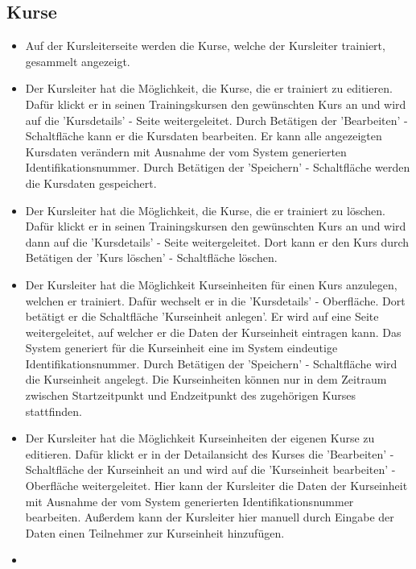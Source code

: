 \documentclass[a4paper]{scrreprt}
\begin{document}
		\subsection{Kurse}
			\begin{itemize}
				\item {}
					Auf der Kursleiterseite werden die Kurse, welche der Kursleiter trainiert, gesammelt angezeigt.
				\item {}
					Der Kursleiter hat die Möglichkeit, die Kurse, die er  trainiert zu editieren. Dafür klickt er in seinen Trainingskursen den gewünschten Kurs an und wird auf die 'Kursdetails' - Seite weitergeleitet. Durch Betätigen der 'Bearbeiten' - Schaltfläche kann er die Kursdaten bearbeiten. Er kann alle angezeigten Kursdaten verändern mit Ausnahme der vom System generierten Identifikationsnummer. Durch Betätigen der 'Speichern' - Schaltfläche werden die Kursdaten gespeichert.
				\item {}
					Der Kursleiter hat die Möglichkeit, die Kurse, die er  trainiert zu löschen. Dafür klickt er in seinen Trainingskursen den gewünschten Kurs an und wird dann auf die 'Kursdetails' - Seite weitergeleitet. Dort kann er den Kurs durch Betätigen der 'Kurs löschen' - Schaltfläche löschen.
				\item {}
					Der Kursleiter hat die Möglichkeit Kurseinheiten für einen Kurs anzulegen, welchen er trainiert. Dafür wechselt er in die 'Kursdetails' - Oberfläche. Dort betätigt er die Schaltfläche 'Kurseinheit anlegen'. Er wird auf eine Seite weitergeleitet, auf welcher er die Daten der Kurseinheit eintragen kann. Das System generiert für die Kurseinheit eine im System eindeutige Identifikationsnummer. Durch Betätigen der 'Speichern' - Schaltfläche wird die Kurseinheit angelegt. Die Kurseinheiten können nur in dem Zeitraum zwischen Startzeitpunkt und Endzeitpunkt des zugehörigen Kurses stattfinden.
				\item {}
					Der Kursleiter hat die Möglichkeit Kurseinheiten der eigenen Kurse zu editieren. Dafür klickt er in der Detailansicht des Kurses die 'Bearbeiten' - Schaltfläche der Kurseinheit an und wird auf die 'Kurseinheit bearbeiten' - Oberfläche weitergeleitet. Hier kann der Kursleiter die Daten der Kurseinheit mit Ausnahme der vom System generierten Identifikationsnummer bearbeiten. Außerdem kann der Kursleiter hier manuell durch Eingabe der Daten einen Teilnehmer zur Kurseinheit hinzufügen.
				\item {}

\end{itemize}
\end{document}
